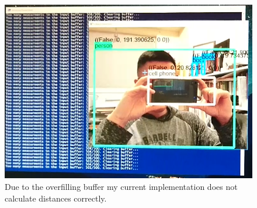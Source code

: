 \documentclass[onecolumn, draftclsnofoot,10pt, compsoc]{IEEEtran}
\makeatletter
\newcommand\captionof[1]{\def\@captype{#1}\caption}
\makeatother
\begin{document}
\begin{singlespace}
			\begin{figure}[H]
			\includegraphics[scale=0.45]{reading.PNG}
			\captionof{figure}{Due to the overfilling buffer my current implementation does not calculate distances correctly.}
			\label{reading}
			\end{figure}


	\clearpage

\end{singlespace}
\end{document}
